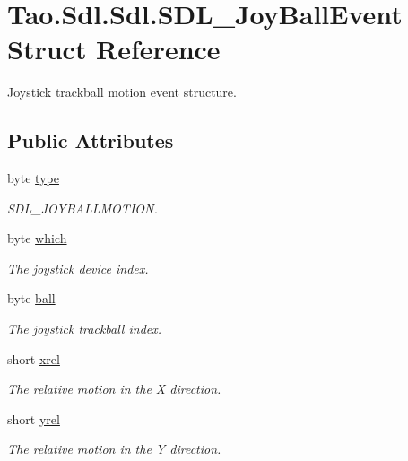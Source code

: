 \hypertarget{struct_tao_1_1_sdl_1_1_sdl_1_1_s_d_l___joy_ball_event}{
\section{Tao.Sdl.Sdl.SDL\_\-JoyBallEvent Struct Reference}
\label{struct_tao_1_1_sdl_1_1_sdl_1_1_s_d_l___joy_ball_event}
}


Joystick trackball motion event structure.  


\subsection*{Public Attributes}
\begin{DoxyCompactItemize}
\item 
byte \hyperlink{struct_tao_1_1_sdl_1_1_sdl_1_1_s_d_l___joy_ball_event_a6a038a07869c454162161bb1705fc5d8}{type}
\begin{DoxyCompactList}\small\item\em SDL\_\-JOYBALLMOTION. \item\end{DoxyCompactList}\item 
byte \hyperlink{struct_tao_1_1_sdl_1_1_sdl_1_1_s_d_l___joy_ball_event_ae830b51d29124cac5cd566050bdb89c9}{which}
\begin{DoxyCompactList}\small\item\em The joystick device index. \item\end{DoxyCompactList}\item 
byte \hyperlink{struct_tao_1_1_sdl_1_1_sdl_1_1_s_d_l___joy_ball_event_ae04564d94976afbed00b8f63f7cc4b76}{ball}
\begin{DoxyCompactList}\small\item\em The joystick trackball index. \item\end{DoxyCompactList}\item 
short \hyperlink{struct_tao_1_1_sdl_1_1_sdl_1_1_s_d_l___joy_ball_event_af581dbbfb3bd257fc84db29b95a7a17e}{xrel}
\begin{DoxyCompactList}\small\item\em The relative motion in the X direction. \item\end{DoxyCompactList}\item 
short \hyperlink{struct_tao_1_1_sdl_1_1_sdl_1_1_s_d_l___joy_ball_event_a6a627ec33bba38a21c2d0c6f2b09a41a}{yrel}
\begin{DoxyCompactList}\small\item\em The relative motion in the Y direction. \item\end{DoxyCompactList}\end{DoxyCompactItemize}


